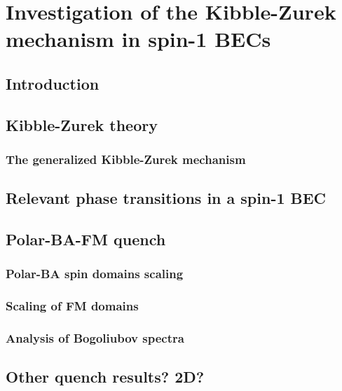 \chapter{Investigation of the Kibble-Zurek mechanism in spin-1 BECs}

\section{Introduction}

\section{Kibble-Zurek theory}
\subsection{The generalized Kibble-Zurek mechanism}

\section{Relevant phase transitions in a spin-1 BEC}

\section{Polar-BA-FM quench}
\subsection{Polar-BA spin domains scaling}
\subsection{Scaling of FM domains}
\subsection{Analysis of Bogoliubov spectra}

\section{Other quench results? 2D?}
